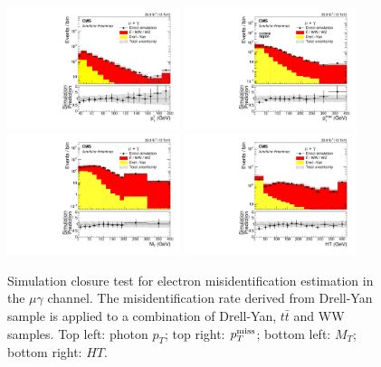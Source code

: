 \documentclass[thesis.tex]{subfiles}
\renewcommand\_{\textunderscore\allowbreak}
\begin{document}
\begin{figure}[hbtp]
  \centering
    \includegraphics[width=0.45\textwidth]{Fig/closure_elefakepho_PhotonEt_mg.pdf}
    \includegraphics[width=0.45\textwidth]{Fig/closure_elefakepho_MET_mg.pdf}
    \includegraphics[width=0.45\textwidth]{Fig/closure_elefakepho_MT_mg.pdf}
    \includegraphics[width=0.45\textwidth]{Fig/closure_elefakepho_HT_mg.pdf}
  \caption{Simulation closure test for electron misidentification estimation in the $\mu\gamma$ channel. The misidentification rate derived from Drell-Yan sample is applied to a combination of Drell-Yan, $t\bar{t}$ and WW samples. Top left: photon $p_T$; top right: $p_T^\textrm{miss}$; bottom left: $M_T$; bottom right: $HT$.}
  \label{fig:efakephoclosure_mg}
\end{figure}
\end{document}
